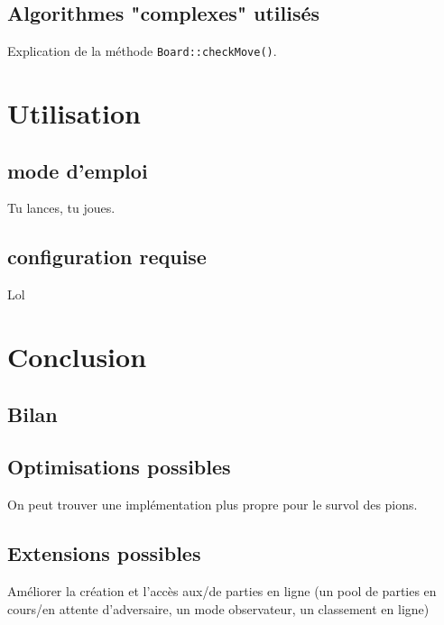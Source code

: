 \documentclass[12pt]{article}
\begin{document}
	\subsection{Algorithmes "complexes" utilisés}
	Explication de la méthode \texttt{Board::checkMove()}.

\section{Utilisation}
	\subsection{mode d'emploi}
	Tu lances, tu joues.
	\subsection{configuration requise}
	Lol

\section{Conclusion}
	\subsection{Bilan}


	\subsection{Optimisations possibles}
	On peut trouver une implémentation plus propre pour le survol des pions.

	\subsection{Extensions possibles}
	Améliorer la création et l'accès aux/de parties en ligne (un pool de parties en cours/en attente d'adversaire, un mode observateur, un classement en ligne)

\newpage


\end{document}
